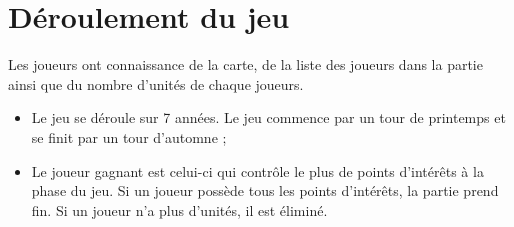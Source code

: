 \section{Déroulement du jeu}
	Les joueurs ont connaissance de la carte, de la liste des joueurs dans la partie ainsi que du nombre d'unités de chaque joueurs.
	\begin{itemize}
		\item Le jeu se déroule sur 7 années. Le jeu commence par un tour de printemps et se finit par un tour d'automne ;
		\item Le joueur gagnant est celui-ci qui contrôle le plus de points d'intérêts à la phase du jeu. Si un joueur possède tous les points d'intérêts, la partie prend fin. Si un joueur n'a plus d'unités, il est éliminé.
	\end{itemize}